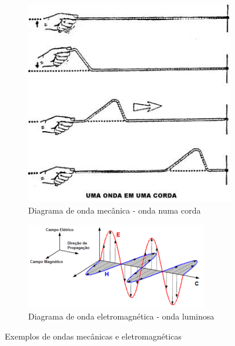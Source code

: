 \documentclass[12pt]{extarticle}
\newcommand{\<}{\langle}
\renewcommand{\>}{\rangle}
\theoremstyle{definition}
\begin{document}
\begin{figure}[H]
     \centering
     \begin{subfigure}[b]{0.45\textwidth}
         \centering
         \includegraphics[width=\textwidth]{unidimensionais.jpg}
         \caption{Diagrama de onda mecânica - onda numa corda}
         \label{fig:mecanica}
     \end{subfigure}
     \hfill
     \begin{subfigure}[b]{0.45\textwidth}
         \centering
         \includegraphics[width=\textwidth]{ondas_eletro.png}
         \caption{Diagrama de onda eletromagnética - onda luminosa}
         \label{fig:eletromagnetica}
     \end{subfigure}
        \caption{Exemplos de ondas mecânicas e eletromagnéticas}
        \label{fig:ondas_natureza}
\end{figure}
\end{document}
